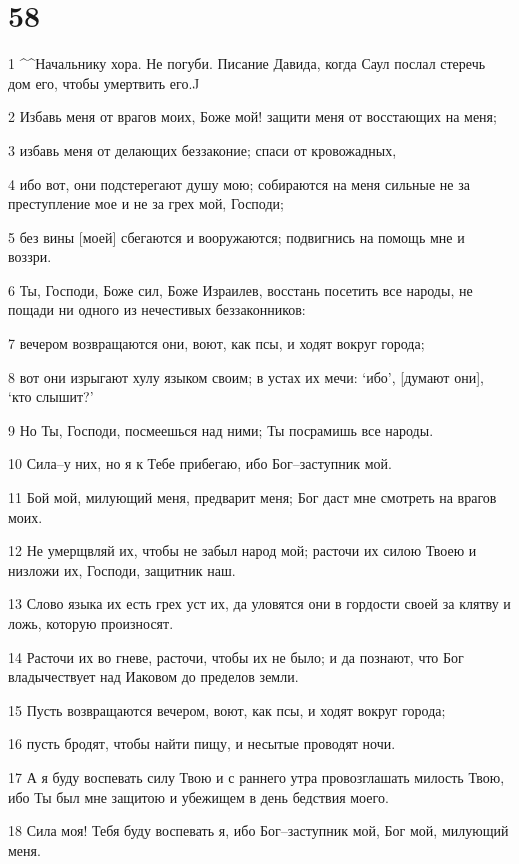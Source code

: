 \chapter{58}

\par 1 ^^Начальнику хора. Не погуби. Писание Давида, когда Саул послал стеречь дом его, чтобы умертвить его.^^
\par 2 Избавь меня от врагов моих, Боже мой! защити меня от восстающих на меня;
\par 3 избавь меня от делающих беззаконие; спаси от кровожадных,
\par 4 ибо вот, они подстерегают душу мою; собираются на меня сильные не за преступление мое и не за грех мой, Господи;
\par 5 без вины [моей] сбегаются и вооружаются; подвигнись на помощь мне и воззри.
\par 6 Ты, Господи, Боже сил, Боже Израилев, восстань посетить все народы, не пощади ни одного из нечестивых беззаконников:
\par 7 вечером возвращаются они, воют, как псы, и ходят вокруг города;
\par 8 вот они изрыгают хулу языком своим; в устах их мечи: `ибо', [думают они], `кто слышит?'
\par 9 Но Ты, Господи, посмеешься над ними; Ты посрамишь все народы.
\par 10 Сила--у них, но я к Тебе прибегаю, ибо Бог--заступник мой.
\par 11 Бой мой, милующий меня, предварит меня; Бог даст мне смотреть на врагов моих.
\par 12 Не умерщвляй их, чтобы не забыл народ мой; расточи их силою Твоею и низложи их, Господи, защитник наш.
\par 13 Слово языка их есть грех уст их, да уловятся они в гордости своей за клятву и ложь, которую произносят.
\par 14 Расточи их во гневе, расточи, чтобы их не было; и да познают, что Бог владычествует над Иаковом до пределов земли.
\par 15 Пусть возвращаются вечером, воют, как псы, и ходят вокруг города;
\par 16 пусть бродят, чтобы найти пищу, и несытые проводят ночи.
\par 17 А я буду воспевать силу Твою и с раннего утра провозглашать милость Твою, ибо Ты был мне защитою и убежищем в день бедствия моего.
\par 18 Сила моя! Тебя буду воспевать я, ибо Бог--заступник мой, Бог мой, милующий меня.

